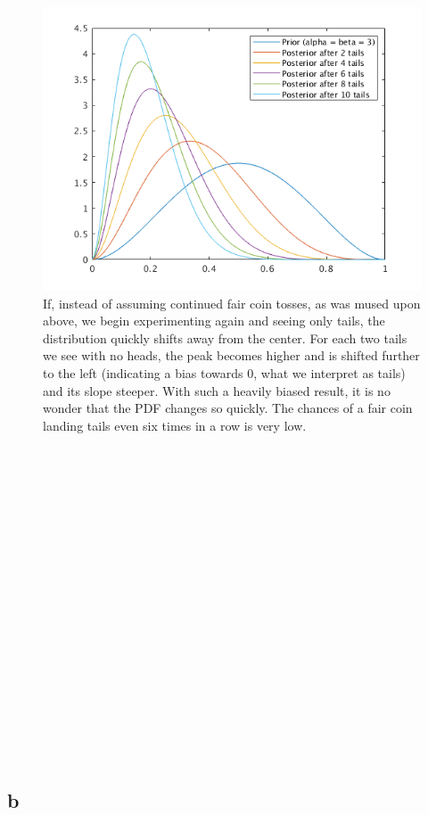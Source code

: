 \documentclass{article}
\begin{document}
\begin{figure}[!ht]
	\centering
	\includegraphics[width=120mm]{q2-all-plots.png}
	\caption{ If, instead of assuming continued fair coin tosses, as was mused 
        upon above, we begin experimenting again and seeing only tails, the 
        distribution quickly shifts away from the center. For each two tails we 
        see with no heads, the peak becomes higher and is shifted further to 
        the left (indicating a bias towards 0, what we interpret as tails) and its 
        slope steeper. With such a heavily biased result, it is no wonder that 
        the PDF changes so quickly. The chances of a fair coin landing tails 
        even six times in a row is very low. }
\end{figure}

~\\
~\\
~\\
~\\
~\\
~\\
~\\
~\\
~\\
~\\
~\\
~\\
~\\
~\\
~\\
~\\
~\\
~\\

\subsection{b}
\end{document}
